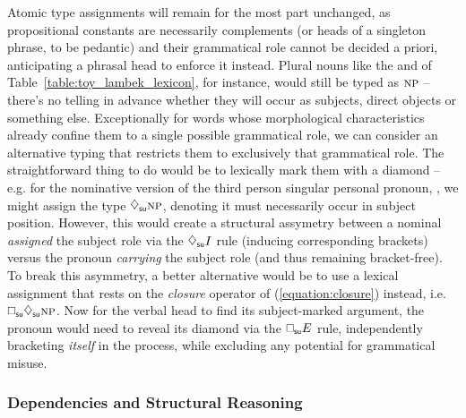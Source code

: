 Atomic type assignments will remain for the most part unchanged, as propositional constants are necessarily complements (or heads of a singleton phrase, to be pedantic) and their grammatical role cannot be decided a priori, anticipating a phrasal head to enforce it instead.
Plural nouns like the  and  of Table~\ref{table:toy_lambek_lexicon}, for instance, would still be typed as $\np[s]$ -- there's no telling in advance whether they will occur as subjects, direct objects or something else.
Exceptionally for words whose morphological characteristics already confine them to a single possible grammatical role, we can consider an alternative typing that restricts them to exclusively that grammatical role.
The straightforward thing to do would be to lexically mark them with a diamond -- e.g. for the nominative version of the third person singular personal pronoun, , we might assign the type $\ddia{su}\np[s]$, denoting it must necessarily occur in subject position.
However, this would create a structural assymetry between a nominal \textit{assigned} the subject role via the $\ddia{su} I$ rule (inducing corresponding brackets) versus the pronoun \textit{carrying} the subject role (and thus remaining bracket-free).
To break this asymmetry, a better alternative would be to use a lexical assignment that rests on the \textit{closure} operator of (\ref{equation:closure}) instead, i.e. $\dbox{su}\ddia{su}\np[s]$.
Now for the verbal head to find its subject-marked argument, the pronoun would need to reveal its diamond via the $\dbox{su} E$ rule, independently bracketing \textit{itself} in the process, while excluding any potential for grammatical misuse.

\subsubsection{Dependencies and Structural Reasoning}
